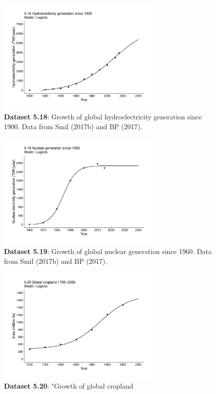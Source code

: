 \documentclass[aps,rmp,preprint,superscriptaddress,10pt,onecolumn]{article}
\begin{document}
\begin{figure}[h]
\includegraphics[width=8cm]{output/figs-ggplot/5.18.pdf}
\caption{\textbf{Dataset 5.18}: Growth of global hydroelectricity generation since 1900. Data from Smil (2017b) and BP (2017).}
\end{figure}
	
\begin{figure}[h]
\includegraphics[width=8cm]{output/figs-ggplot/5.19.pdf}
\caption{\textbf{Dataset 5.19}: Growth of global nuclear generation since 1960. Data from Smil (2017b) and BP (2017).}
\end{figure}
	
\begin{figure}[h]
\includegraphics[width=8cm]{output/figs-ggplot/5.20.pdf}
\caption{\textbf{Dataset 5.20}: "Growth of global cropland}
\end{figure}
	
\end{document}
